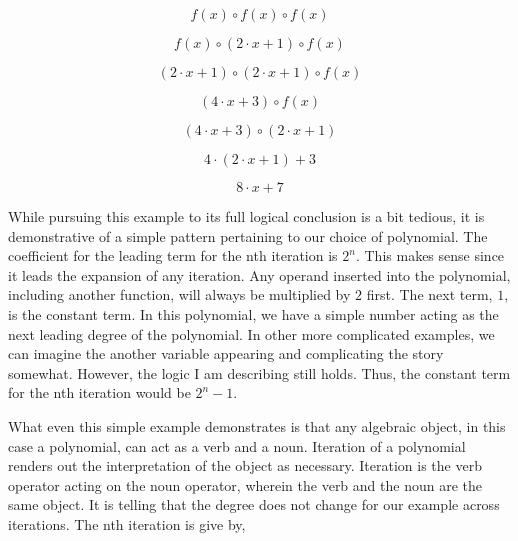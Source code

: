 \begin{equation}
    f(x) \circ f(x) \circ f(x)
\end{equation}

\begin{equation}
    f(x) \circ (2 \cdot x + 1) \circ f(x)
\end{equation}

\begin{equation}
    (2 \cdot x + 1) \circ (2 \cdot x + 1) \circ f(x)
\end{equation}

\begin{equation}
    ( 4 \cdot x + 3) \circ f(x)
\end{equation}

\begin{equation}
    ( 4 \cdot x + 3) \circ (2 \cdot x + 1)
\end{equation}

\begin{equation}
    4 \cdot (2 \cdot x + 1) + 3
\end{equation}

\begin{equation}
    8 \cdot x + 7
\end{equation}

While pursuing this example to its full logical conclusion is a bit tedious, it
is demonstrative of a simple pattern pertaining to our choice of polynomial.
The coefficient for the leading term for the nth iteration is $2^n$. This makes
sense since it leads the expansion of any iteration. Any operand inserted into
the polynomial, including another function, will always be multiplied by $2$
first. The next term, $1$, is the constant term. In this polynomial, we have a
simple number acting as the next leading degree of the polynomial. In other
more complicated examples, we can imagine the another variable appearing and
complicating the story somewhat. However, the logic I am describing still
holds. Thus, the constant term for the nth iteration would be $2^n - 1$.

What even this simple example demonstrates is that any algebraic object, in
this case a polynomial, can act as a verb and a noun. Iteration of a polynomial
renders out the interpretation of the object as necessary. Iteration is the
verb operator acting on the noun operator, wherein the verb and the noun are
the same object. It is telling that the degree does not change for our example
across iterations. The nth iteration is give by,

